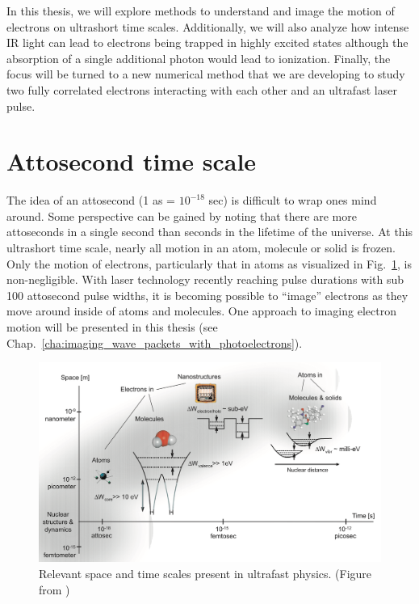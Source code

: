 In this thesis, we will explore methods to understand and image the motion of electrons on ultrashort time scales. Additionally, we will also analyze how intense IR light can lead to electrons being trapped in highly excited states although the absorption of a single additional photon would lead to ionization. Finally, the focus will be turned to a new numerical method that we are developing to study two fully correlated electrons interacting with each other and an ultrafast laser pulse. 

\section{Attosecond time scale}
The idea of an attosecond (1 as = $10^{-18}$ sec) is difficult to wrap ones mind around. Some perspective can be gained by noting that there are more attoseconds in a single second than seconds in the lifetime of the universe. At this ultrashort time scale, nearly all motion in an atom, molecule or solid is frozen. Only the motion of electrons, particularly that in atoms as visualized in Fig.~\ref{fig:time_scales}, is non-negligible. With laser technology recently reaching pulse durations with sub 100 attosecond pulse widths, it is becoming possible to ``image'' electrons as they move around inside of atoms and molecules. One approach to imaging electron motion will be presented in this thesis (see  Chap.~\ref{cha:imaging_wave_packets_with_photoelectrons}).

\begin{figure}[!ht]
\centering
\includegraphics[width=0.8\columnwidth]{figs/Intro/time_scales.png}
\caption{\label{fig:time_scales} Relevant space and time scales present in ultrafast physics. (Figure from \cite{krausz2009})
}
\end{figure}

